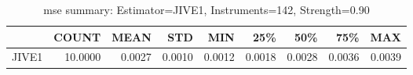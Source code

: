 \begin{table}[ht]
\centering
\caption{mse summary: Estimator=JIVE1, Instruments=142, Strength=0.90}
\begin{tabular}{lrrrrrrrr}
\toprule
 & COUNT & MEAN & STD & MIN & 25\% & 50\% & 75\% & MAX \\
\midrule
JIVE1 & 10.0000 & 0.0027 & 0.0010 & 0.0012 & 0.0018 & 0.0028 & 0.0036 & 0.0039 \\
\bottomrule
\end{tabular}
\end{table}
